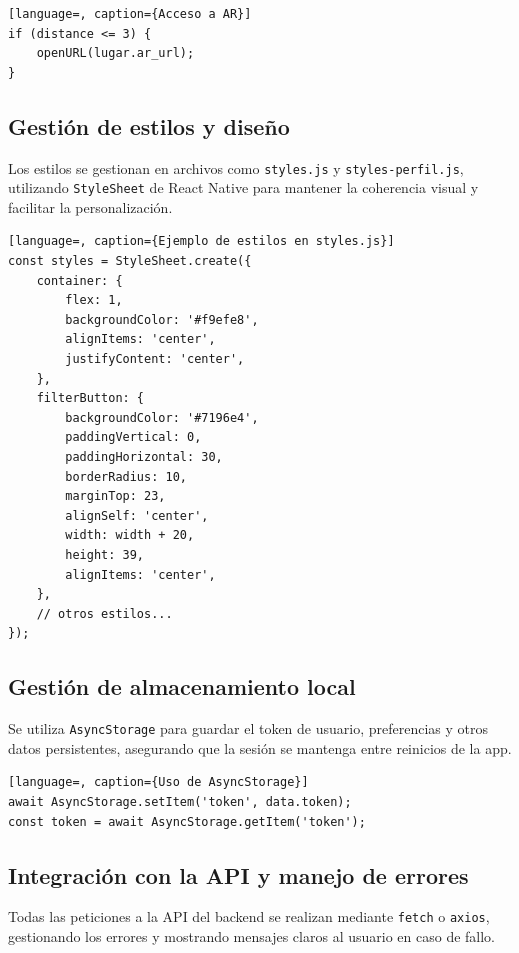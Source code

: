 \begin{lstlisting}[language=, caption={Acceso a AR}]
if (distance <= 3) {
    openURL(lugar.ar_url);
}
\end{lstlisting}

\subsection{Gestión de estilos y diseño}

Los estilos se gestionan en archivos como \texttt{styles.js} y \texttt{styles-perfil.js}, utilizando \texttt{StyleSheet} de React Native para mantener la coherencia visual y facilitar la personalización.

\begin{lstlisting}[language=, caption={Ejemplo de estilos en styles.js}]
const styles = StyleSheet.create({
    container: {
        flex: 1,
        backgroundColor: '#f9efe8',
        alignItems: 'center',
        justifyContent: 'center',
    },
    filterButton: {
        backgroundColor: '#7196e4',
        paddingVertical: 0,
        paddingHorizontal: 30,
        borderRadius: 10,
        marginTop: 23,
        alignSelf: 'center',
        width: width + 20,
        height: 39,
        alignItems: 'center',
    },
    // otros estilos...
});
\end{lstlisting}

\subsection{Gestión de almacenamiento local}

Se utiliza \texttt{AsyncStorage} para guardar el token de usuario, preferencias y otros datos persistentes, asegurando que la sesión se mantenga entre reinicios de la app.

\begin{lstlisting}[language=, caption={Uso de AsyncStorage}]
await AsyncStorage.setItem('token', data.token);
const token = await AsyncStorage.getItem('token');
\end{lstlisting}

\subsection{Integración con la API y manejo de errores}

Todas las peticiones a la API del backend se realizan mediante \texttt{fetch} o \texttt{axios}, gestionando los errores y mostrando mensajes claros al usuario en caso de fallo.

